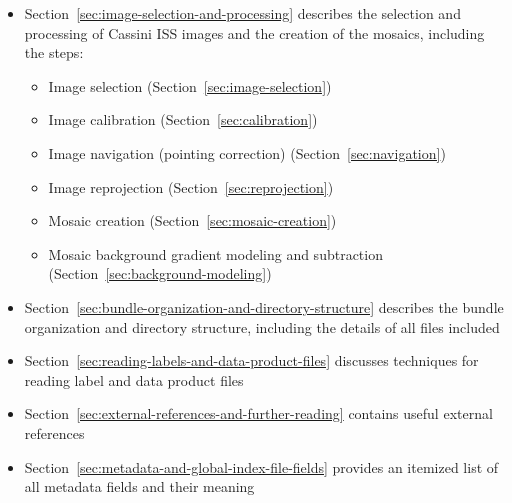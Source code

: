 \begin{itemize}
\item Section~\ref{sec:image-selection-and-processing} describes the selection and processing of Cassini ISS images and the creation of the mosaics, including the steps:
\begin{itemize}
\item Image selection (Section~\ref{sec:image-selection})
\item Image calibration (Section~\ref{sec:calibration})
\item Image navigation (pointing correction) (Section~\ref{sec:navigation})
\item Image reprojection (Section~\ref{sec:reprojection})
\item Mosaic creation (Section~\ref{sec:mosaic-creation})
\item Mosaic background gradient modeling and subtraction (Section~\ref{sec:background-modeling})
\end{itemize}
\item Section~\ref{sec:bundle-organization-and-directory-structure} describes the bundle organization and directory structure, including the details of all files included
\item Section~\ref{sec:reading-labels-and-data-product-files} discusses techniques for reading label and data product files
\item Section~\ref{sec:external-references-and-further-reading} contains useful external references
\item Section~\ref{sec:metadata-and-global-index-file-fields} provides an itemized list of all metadata fields and their meaning
\end{itemize}
